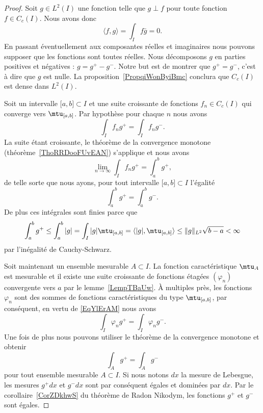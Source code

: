 \begin{proof}
    Soit \( g\in L^2(I)\) une fonction telle que \( g\perp f\) pour toute fonction \( f\in C_c(I)\). Nous avons donc
    \begin{equation}
        \langle f, g\rangle =\int_If\bar g=0.
    \end{equation}
    En passant éventuellement aux composantes réelles et imaginaires nous pouvons supposer que les fonctions sont toutes réelles. Nous décomposons \( g\) en parties positives et négatives : \( g=g^+-g^-\). Notre but est de montrer que \( g^+=g^-\), c'est à dire que \( g\) est nulle. La proposition~\ref{PropqiWonByiBmc} conclura que \( C_c(I)\) est dense dans \( L^2(I)\).

    Soit un intervalle \( \mathopen[ a , b \mathclose]\subset I\) et une suite croissante de fonctions \( f_n\in C_c(I)\) qui converge vers \( \mtu_{\mathopen[ a , b \mathclose]}\). Par hypothèse pour chaque \( n\) nous avons
    \begin{equation}
        \int_If_ng^+=\int_I f_ng^-.
    \end{equation}
    La suite étant croissante, le théorème de la convergence monotone (théorème~\ref{ThoRRDooFUvEAN}) s'applique et nous avons
    \begin{equation}
        \lim_{n\to \infty} \int_I f_ng^+=\int_a^bg^+,
    \end{equation}
    de telle sorte que nous ayons, pour tout intervalle \( \mathopen[ a , b \mathclose]\subset I\) l'égalité
    \begin{equation}        \label{EqYlErAM}
        \int_a^bg^+=\int_a^bg^-.
    \end{equation}
    De plus ces intégrales sont finies parce que
    \begin{equation}
        \int_a^b g^+\leq\int_a^b| g |=\int_I| g |\mtu_{\mathopen[ a , b \mathclose]}=\langle | g |, \mtu_{\mathopen[ a , b \mathclose]}\rangle \leq \| g \|_{L^2}\sqrt{b-a}<\infty
    \end{equation}
    par l'inégalité de Cauchy-Schwarz.

    Soit maintenant un ensemble mesurable \( A\subset I\). La fonction caractéristique \( \mtu_A\) est mesurable et il existe une suite croissante de fonctions étagées \( (\varphi_n)\) convergente vers \( a\) par le lemme~\ref{LempTBaUw}. À multiples près, les fonctions \( \varphi_n\) sont des sommes de fonctions caractéristiques du type \( \mtu_{\mathopen[ a , b \mathclose]}\), par conséquent, en vertu de \eqref{EqYlErAM} nous avons
    \begin{equation}
        \int_I\varphi_ng^+=\int_I\varphi_ng^-.
    \end{equation}
    Une fois de plus nous pouvons utiliser le théorème de la convergence monotone et obtenir
    \begin{equation}
        \int_Ag^+=\int_A g^-
    \end{equation}
    pour tout ensemble mesurable \( A\subset I\). Si nous notons \( dx\) la mesure de Lebesgue, les mesures \( g^+dx\) et \( g^-dx\) sont par conséquent égales et dominées par \( dx\). Par le corollaire~\ref{CorZDkhwS} du théorème de Radon Nikodym, les fonctions \( g^+\) et \( g^-\) sont égales.
\end{proof}

